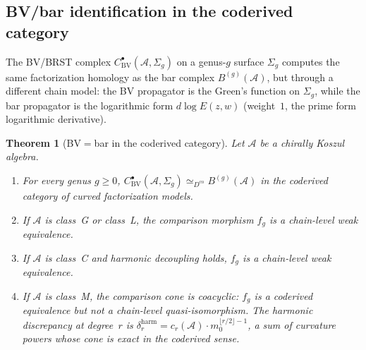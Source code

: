 \documentclass[11pt,reqno]{amsart}
\newtheorem{theorem}{Theorem}[section]
\theoremstyle{definition}
\theoremstyle{remark}
\newcommand{\cA}{\mathcal{A}}
\numberwithin{equation}{section}
\begin{document}
\subsection{BV/bar identification in the coderived category}

The BV/BRST complex $C^\bullet_{\mathrm{BV}}(\cA, \Sigma_g)$
on a genus-$g$ surface $\Sigma_g$ computes the same factorization
homology as the bar complex $B^{(g)}(\cA)$, but through a
different chain model: the BV propagator is the Green's function
on $\Sigma_g$, while the bar propagator is the logarithmic form
$d\log E(z,w)$ (weight~$1$, the prime form logarithmic
derivative).

\begin{theorem}[BV$=$bar in the coderived category]
\label{thm:kfc-bv-bar}
Let $\cA$ be a chirally Koszul algebra.
\begin{enumerate}[label=\textup{(\roman*)}]
\item For every genus $g \geq 0$,
  $C^\bullet_{\mathrm{BV}}(\cA, \Sigma_g)
  \simeq_{D^{\mathrm{co}}} B^{(g)}(\cA)$
  in the coderived category of curved factorization models.
\item If $\cA$ is class~G or class~L, the comparison morphism
  $f_g$ is a chain-level weak equivalence.
\item If $\cA$ is class~C and harmonic decoupling holds,
  $f_g$ is a chain-level weak equivalence.
\item If $\cA$ is class~M, the comparison cone is coacyclic:
  $f_g$ is a coderived equivalence but \emph{not} a chain-level
  quasi-isomorphism. The harmonic discrepancy at degree~$r$ is
  $\delta_r^{\mathrm{harm}} = c_r(\cA) \cdot
  m_0^{\lfloor r/2 \rfloor - 1}$,
  a sum of curvature powers whose cone is exact in the coderived
  sense.
\end{enumerate}
\end{theorem}
\end{document}
